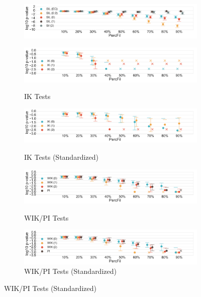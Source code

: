 \documentclass[12pt]{article}
\begin{document}
\begin{center}
\begin{figure}[htp!]
\begin{subfigure}{.48\textwidth}
        \includegraphics[width=\linewidth, height = .75in]{figure_8_all_silhouette_group_normed.pdf}
        \label{fig:all_silh_normed_normed}
      \end{subfigure}
      \begin{subfigure}{.48\textwidth}
        \centering
        \caption{IK Tests}
        \includegraphics[width=\linewidth, height = .75in]{figure_8_all_contour_group.pdf}
        \label{fig:all_contour}
      \end{subfigure}
      \begin{subfigure}{.48\textwidth}
        \centering
        \caption{IK Tests (Standardized)}
        \includegraphics[width=\linewidth, height = .75in]{figure_8_all_contour_group_normed.pdf}
        \label{fig:all_contour_normed}
      \end{subfigure}
      \begin{subfigure}{.48\textwidth}
        \centering
        \caption{WIK/PI Tests}
        \includegraphics[width=\linewidth, height = .75in]{figure_8_all_weighted_contour_group.pdf}
        \label{fig:all_weight}
      \end{subfigure}
      \begin{subfigure}{.48\textwidth}
        \centering
        \caption{WIK/PI Tests (Standardized)}
        \includegraphics[width=\linewidth, height = .75in]{figure_8_all_weighted_contour_group_normed.pdf}

\end{subfigure}
\end{figure}
\end{center}
\end{document}
